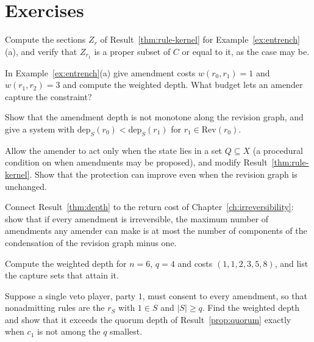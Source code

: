 \section*{Exercises}

\begin{exercise}
Compute the sections $Z_r$ of Result~\ref{thm:rule-kernel} for Example~\ref{ex:entrench}(a), and verify that $Z_{r_1}$ is a proper subset of $C$ or equal to it, as the case may be.
\end{exercise}

\begin{exercise}
In Example~\ref{ex:entrench}(a) give amendment costs $w(r_0,r_1)=1$ and $w(r_1,r_2)=3$ and compute the weighted depth. What budget lets an amender capture the constraint?
\end{exercise}

\begin{exercise}
Show that the amendment depth is not monotone along the revision graph, and give a system with $\mathrm{dep}_S(r_0)<\mathrm{dep}_S(r_1)$ for $r_1\in\mathrm{Rev}(r_0)$.
\end{exercise}

\begin{exercise}
Allow the amender to act only when the state lies in a set $Q\subseteq X$ (a procedural condition on when amendments may be proposed), and modify Result~\ref{thm:rule-kernel}. Show that the protection can improve even when the revision graph is unchanged.
\end{exercise}

\begin{exercise}
Connect Result~\ref{thm:depth} to the return cost of Chapter~\ref{ch:irreversibility}: show that if every amendment is irreversible, the maximum number of amendments any amender can make is at most the number of components of the condensation of the revision graph minus one.
\end{exercise}

\begin{exercise}
Compute the weighted depth for $n=6$, $q=4$ and costs $(1,1,2,3,5,8)$, and list the capture sets that attain it.\label{ex2:weighted-six}
\end{exercise}

\begin{exercise}
Suppose a single veto player, party $1$, must consent to every amendment, so that nonadmitting rules are the $r_S$ with $1\in S$ and $|S|\ge q$. Find the weighted depth and show that it exceeds the quorum depth of Result~\ref{prop:quorum} exactly when $c_1$ is not among the $q$ smallest.\label{ex2:veto}
\end{exercise}

